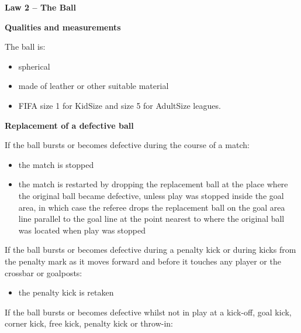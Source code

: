 \clearpage
\sffamily
{\bfseries\color[rgb]{0.4,0.4,0.4}
Law 2 -- The Ball}
{}


\bigskip

{\bfseries Qualities and measurements }

\headlinebox

The ball is:

\begin{itemize}
\item spherical
\item made of leather or other suitable material
\item FIFA size 1 for KidSize and size 5 for AdultSize leagues. 
\end{itemize}

{\bfseries Replacement of a defective ball }

\headlinebox

If the ball bursts or becomes defective during the course of a match:

\begin{itemize}
\item the match is stopped
\item the match is restarted by dropping the replacement ball at the place where the original ball became defective, unless play was stopped inside the goal area, in which case the referee drops the replacement ball on the goal area line parallel to the goal line at the point
nearest to where the original ball was located when play was stopped
\end{itemize}

If the ball bursts or becomes defective during a penalty kick or during kicks from the penalty mark as it moves forward and before it touches any player or the crossbar or goalposts: 

\begin{itemize}
\item the penalty kick is retaken
\end{itemize}

If the ball bursts or becomes defective whilst not in play at a kick-off, goal kick, corner kick, free kick, penalty kick or throw-in:

